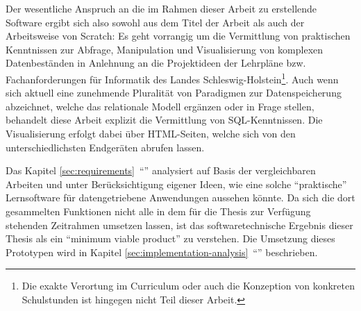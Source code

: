 Der wesentliche Anspruch an die im Rahmen dieser Arbeit zu erstellende Software ergibt sich also sowohl aus dem Titel der Arbeit als auch der Arbeitsweise von Scratch: Es geht vorrangig um die Vermittlung von praktischen Kenntnissen zur Abfrage, Manipulation und Visualisierung von komplexen Datenbeständen in Anlehnung an die Projektideen der Lehrpläne \cite{lehrplan-inf-sek-1} bzw. Fachanforderungen \cite{lehrplan-inf-sek-2} für Informatik des Landes Schleswig-Holstein\footnote{Die exakte Verortung im Curriculum oder auch die Konzeption von konkreten Schulstunden ist hingegen nicht Teil dieser Arbeit.}. Auch wenn sich aktuell eine zunehmende Pluralität von Paradigmen zur Datenspeicherung abzeichnet, welche das relationale Modell ergänzen oder in Frage stellen, behandelt diese Arbeit explizit die Vermittlung von SQL-Kenntnissen. Die Visualisierung erfolgt dabei über HTML-Seiten, welche sich von den unterschiedlichsten Endgeräten abrufen lassen.

Das Kapitel \ref{sec:requirements}~"`"' analysiert auf Basis der vergleichbaren Arbeiten und unter Berücksichtigung eigener Ideen, wie eine solche "`praktische"' Lernsoftware für datengetriebene Anwendungen aussehen könnte. Da sich die dort gesammelten Funktionen nicht alle in dem für die Thesis zur Verfügung stehenden Zeitrahmen umsetzen lassen, ist das softwaretechnische Ergebnis dieser Thesis als ein "`minimum viable product"' zu verstehen. Die Umsetzung dieses Prototypen wird in Kapitel \ref{sec:implementation-analysis}~"`"' beschrieben.



